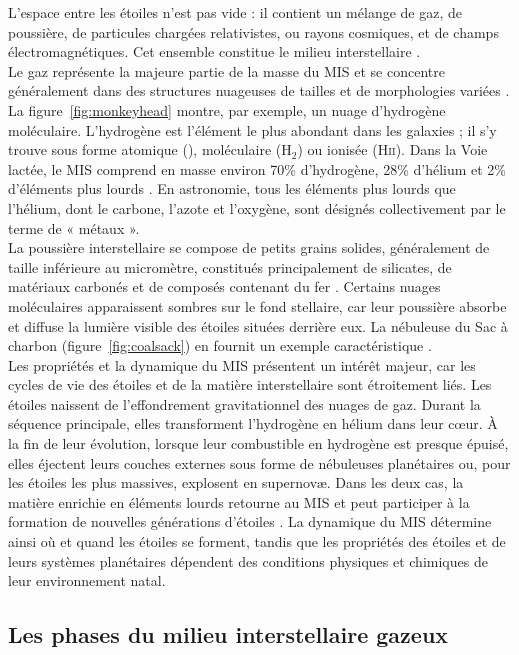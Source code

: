 L'espace entre les étoiles n'est pas vide : il contient un mélange de gaz, de poussière, de particules chargées relativistes, ou rayons cosmiques, et de champs électromagnétiques. Cet ensemble constitue le milieu interstellaire \citep{ISF2011, Ferriere_2001}.\\\indent
Le gaz représente la majeure partie de la masse du MIS et se concentre généralement dans des structures nuageuses de tailles et de morphologies variées \citep{ISF2011}. La figure~\ref{fig:monkeyhead} montre, par exemple, un nuage d'hydrogène moléculaire. L'hydrogène est l'élément le plus abondant dans les galaxies ; il s'y trouve sous forme atomique (\HI), moléculaire (H$_2$) ou ionisée (H\textsc{ii}). Dans la Voie lactée, le MIS comprend en masse environ 70\% d'hydrogène, 28\% d'hélium et 2\% d'éléments plus lourds \citep{Ferriere_2001}. En astronomie, tous les éléments plus lourds que l'hélium, dont le carbone, l'azote et l'oxygène, sont désignés collectivement par le terme de « métaux ».\\\indent
La poussière interstellaire se compose de petits grains solides, généralement de taille inférieure au micromètre, constitués principalement de silicates, de matériaux carbonés et de composés contenant du fer \citep{Zhukovska_2008}. Certains nuages moléculaires apparaissent sombres sur le fond stellaire, car leur poussière absorbe et diffuse la lumière visible des étoiles situées derrière eux. La nébuleuse du Sac à charbon (figure~\ref{fig:coalsack}) en fournit un exemple caractéristique \citep{ISF2011}.\\\indent
Les propriétés et la dynamique du MIS présentent un intérêt majeur, car les cycles de vie des étoiles et de la matière interstellaire sont étroitement liés. Les étoiles naissent de l'effondrement gravitationnel des nuages de gaz. Durant la séquence principale, elles transforment l'hydrogène en hélium dans leur cœur. À la fin de leur évolution, lorsque leur combustible en hydrogène est presque épuisé, elles éjectent leurs couches externes sous forme de nébuleuses planétaires ou, pour les étoiles les plus massives, explosent en supernovæ. Dans les deux cas, la matière enrichie en éléments lourds retourne au MIS et peut participer à la formation de nouvelles générations d'étoiles \citep{ISF2011}. La dynamique du MIS détermine ainsi où et quand les étoiles se forment, tandis que les propriétés des étoiles et de leurs systèmes planétaires dépendent des conditions physiques et chimiques de leur environnement natal.

\subsection{Les phases du milieu interstellaire gazeux}

